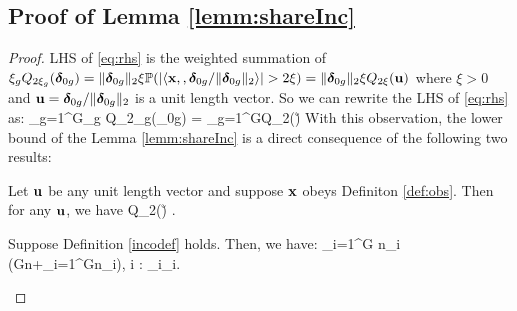 \subsection{Proof of Lemma \ref{lemm:shareInc}}
\begin{proof}
	LHS of \eqref{eq:rhs} is the weighted summation of $\xi_g Q_{2\xi_g}(\boldsymbol{\delta}_{0g}) = \|\boldsymbol{\delta}_{0g}\|_{2}\xi \mathbb{P}(|\langle \mathbf{x}, , \boldsymbol{\delta}_{0g}/\|\boldsymbol{\delta}_{0g}\|_{2} \rangle| > 2\xi) = \|\boldsymbol{\delta}_{0g}\|_{2}\xi Q_{2\xi}(\mathbf{u})$ where $\xi > 0$ and $\mathbf{u} = \boldsymbol{\delta}_{0g}/\|\boldsymbol{\delta}_{0g}\|_{2}$ is a unit length vector. 
	So we can rewrite the LHS of \eqref{eq:rhs} as:
	\be 
	\nr 
	\sum_{g=1}^G\xi_g Q_{2\xi_g}(\ddelta_{0g}) = \sum_{g=1}^G\xi Q_{2\xi}(\u)
	\ee 
	With this observation, the lower bound of the Lemma \ref{lemm:shareInc} is a direct consequence of the following two results: 
	\begin{lemma}\label{paley} Let $\mathbf{u}$ be any unit length vector and suppose $\mathbf{x}$ obeys Definiton \ref{def:obs}. Then for any $\mathbf{u}$, we have
		\be 
		Q_{2\xi}(\u) \geq {}.
		\ee 	
	\end{lemma}
	\begin{lemma} \label{incolem main} Suppose Definition \ref{incodef} holds. Then, we have: 
		\be 
		\sum_{i=1}^G n_i\geq{} \left(Gn+\sum_{i=1}^Gn_i\right), \quad \forall i \in [G]: \ddelta_i\in \cC_i.
		\ee 
	\end{lemma}	
\end{proof}



